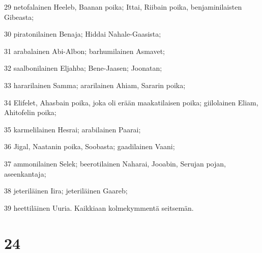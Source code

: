 \par 29 netofalainen Heeleb, Baanan poika; Ittai, Riibain poika, benjaminilaisten Gibeasta;
\par 30 piratonilainen Benaja; Hiddai Nahale-Gaasista;
\par 31 arabalainen Abi-Albon; barhumilainen Asmavet;
\par 32 saalbonilainen Eljahba; Bene-Jaasen; Joonatan;
\par 33 hararilainen Samma; ararilainen Ahiam, Sararin poika;
\par 34 Elifelet, Ahasbain poika, joka oli erään maakatilaisen poika; giilolainen Eliam, Ahitofelin poika;
\par 35 karmelilainen Hesrai; arabilainen Paarai;
\par 36 Jigal, Naatanin poika, Soobasta; gaadilainen Vaani;
\par 37 ammonilainen Selek; beerotilainen Naharai, Jooabin, Serujan pojan, aseenkantaja;
\par 38 jeteriläinen Iira; jeteriläinen Gaareb;
\par 39 heettiläinen Uuria. Kaikkiaan kolmekymmentä seitsemän.

\chapter{24}

